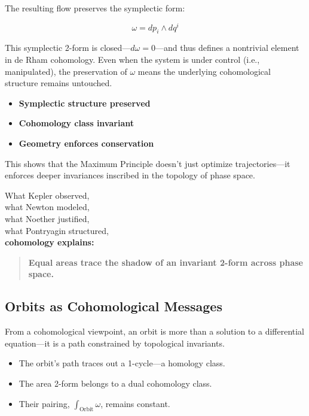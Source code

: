 The resulting flow preserves the symplectic form:

\[
\omega = dp_i \wedge dq^i
\]

This symplectic 2-form is closed—\( d\omega = 0 \)—and thus defines a nontrivial element in de Rham cohomology. Even when the system is under control (i.e., manipulated), the preservation of \( \omega \) means the underlying cohomological structure remains untouched.

\begin{itemize}
    \item \textbf{Symplectic structure preserved}
    \item \textbf{Cohomology class invariant}
    \item \textbf{Geometry enforces conservation}
\end{itemize}

This shows that the Maximum Principle doesn’t just optimize trajectories—it enforces deeper invariances inscribed in the topology of phase space.

\begin{tcolorbox}[colback=blue!5!white, colframe=blue!50!black, title={Kepler's Second Law, Reframed}]
What Kepler observed,\\
what Newton modeled,\\
what Noether justified,\\
what Pontryagin structured,\\
\textbf{cohomology explains:}

\begin{quote}
\textbf{Equal areas trace the shadow of an invariant 2-form across phase space.}
\end{quote}
\end{tcolorbox}

\subsection{Orbits as Cohomological Messages}

From a cohomological viewpoint, an orbit is more than a solution to a differential equation—it is a path constrained by topological invariants.

\begin{itemize}
    \item The orbit’s path traces out a 1-cycle—a homology class.
    \item The area 2-form belongs to a dual cohomology class.
    \item Their pairing, \( \int_{\text{Orbit}} \omega \), remains constant.
\end{itemize}

